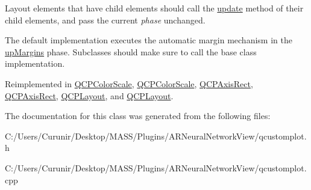 Layout elements that have child elements should call the \hyperlink{class_q_c_p_layout_element_a929c2ec62e0e0e1d8418eaa802e2af9b}{update} method of their child elements, and pass the current {\itshape phase} unchanged.

The default implementation executes the automatic margin mechanism in the \hyperlink{class_q_c_p_layout_element_a0d83360e05735735aaf6d7983c56374dae1924e6bd8696f20d2eb224d8084a268}{up\+Margins} phase. Subclasses should make sure to call the base class implementation. 

Reimplemented in \hyperlink{class_q_c_p_color_scale_a259dcb6d3053a2cc3c197e9b1191ddbe}{Q\+C\+P\+Color\+Scale}, \hyperlink{class_q_c_p_color_scale_a5bbae1d186440907cc95b1afdcfd0290}{Q\+C\+P\+Color\+Scale}, \hyperlink{class_q_c_p_axis_rect_add049d464b9ef2ccdc638adc4ccb4aca}{Q\+C\+P\+Axis\+Rect}, \hyperlink{class_q_c_p_axis_rect_a8c9f5555c257955648465e8293adb7ef}{Q\+C\+P\+Axis\+Rect}, \hyperlink{class_q_c_p_layout_a48ecc9c98ea90b547c3e27a931a8f7bd}{Q\+C\+P\+Layout}, and \hyperlink{class_q_c_p_layout_a2dd1945e29217de03f27228f596d1304}{Q\+C\+P\+Layout}.



The documentation for this class was generated from the following files\+:\begin{DoxyCompactItemize}
\item 
C\+:/\+Users/\+Curunir/\+Desktop/\+M\+A\+S\+S/\+Plugins/\+A\+R\+Neural\+Network\+View/qcustomplot.\+h\item 
C\+:/\+Users/\+Curunir/\+Desktop/\+M\+A\+S\+S/\+Plugins/\+A\+R\+Neural\+Network\+View/qcustomplot.\+cpp\end{DoxyCompactItemize}
